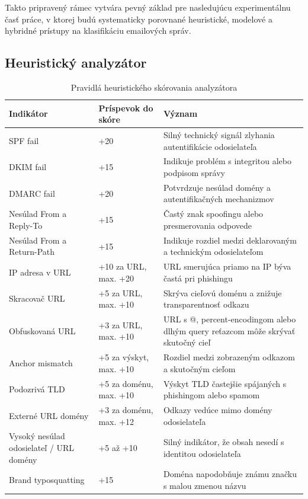 \documentclass[conference]{IEEEtran}
\begin{document}
Takto pripravený rámec vytvára pevný základ pre nasledujúcu experimentálnu časť práce, v ktorej budú systematicky porovnané heuristické, modelové a hybridné prístupy na klasifikáciu emailových správ.


\subsection{Heuristický analyzátor}
\begin{table}[!t]
\label{tab:heuristic_scoring_rules}
\centering
\caption{Pravidlá heuristického skórovania analyzátora}
\footnotesize
\renewcommand{\arraystretch}{1.15}

\begin{tabular}{p{4.5cm} p{2.8cm} p{9cm}}
\toprule
\textbf{Indikátor} & \textbf{Príspevok do skóre} & \textbf{Význam} \\
\midrule
SPF fail & +20 & Silný technický signál zlyhania autentifikácie odosielateľa \\
DKIM fail & +15 & Indikuje problém s integritou alebo podpisom správy \\
DMARC fail & +20 & Potvrdzuje nesúlad domény a autentifikačných mechanizmov \\
Nesúlad From a Reply-To & +15 & Častý znak spoofingu alebo presmerovania odpovede \\
Nesúlad From a Return-Path & +15 & Indikuje rozdiel medzi deklarovaným a technickým odosielateľom \\
IP adresa v URL & +10 za URL, max. +20 & URL smerujúca priamo na IP býva častá pri phishingu \\
Skracovač URL & +5 za URL, max. +10 & Skrýva cieľovú doménu a znižuje transparentnosť odkazu \\
Obfuskovaná URL & +3 za URL, max. +10 & URL s @, percent-encodingom alebo dlhým query reťazcom môže skrývať skutočný cieľ \\
Anchor mismatch & +5 za výskyt, max. +10 & Rozdiel medzi zobrazeným odkazom a skutočným cieľom \\
Podozrivá TLD & +5 za doménu, max. +10 & Výskyt TLD častejšie spájaných s phishingom alebo spamom \\
Externé URL domény & +3 za doménu, max. +12 & Odkazy vedúce mimo domény odosielateľa \\
Vysoký nesúlad odosielateľ / URL domény & +5 až +10 & Silný indikátor, že obsah nesedí s identitou odosielateľa \\
Brand typosquatting & +15 & Doména napodobňuje známu značku s malou zmenou názvu \\

\end{tabular}
\end{table}
\end{document}

